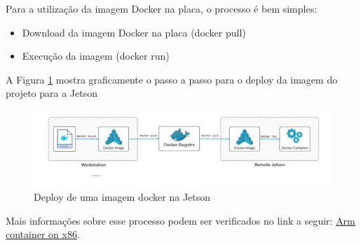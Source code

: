 Para a utilização da imagem Docker na placa, o processo é bem simples:
\begin{itemize}
    \item Download da imagem Docker na placa (docker pull)
    \item Execução da imagem (docker run)
\end{itemize}

A Figura \ref{fig:deploy-jetson} mostra graficamente o passo a passo para o deploy da imagem do projeto para a Jetson

\begin{figure}[h!]
	\centering
		\includegraphics[keepaspectratio=true,scale=0.33]{figuras/deploy-quemu.png}
	\caption{Deploy de uma imagem docker na Jetson \cite{Deploy-Jetson} }
	\label{fig:deploy-jetson}
\end{figure}

Mais informações sobre esse processo podem ser verificados no link a seguir: \href{https://www.stereolabs.com/docs/docker/building-arm-container-on-x86/}{Arm container on x86}.

